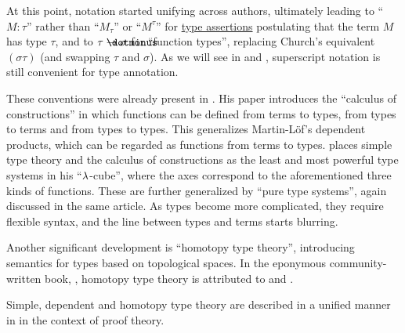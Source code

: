 \begin{remark}
  At this point, notation started unifying across authors, ultimately leading to \enquote{\( M: \tau \)} rather than \enquote{\( M_\tau \)} or \enquote{\( M^\tau \)} for \hyperref[def:type_assertion]{type assertions} postulating that the term \( M \) has type \( \tau \), and to \( \tau \synimplies \sigma \) for \enquote{function types}, replacing Church's equivalent \( (\sigma\tau) \) (and swapping \( \tau \) and \( \sigma \)). As we will see in  and , superscript notation is still convenient for type annotation.

  These conventions were already present in . His paper introduces the \enquote{calculus of constructions} in which functions can be defined from terms to types, from types to terms and from types to types. This generalizes Martin-L\"of's dependent products, which can be regarded as functions from terms to types.  places simple type theory and the calculus of constructions as the least and most powerful type systems in his \enquote{\( \mathrm{\lambda} \)-cube}, where the axes correspond to the aforementioned three kinds of functions. These are further generalized by \enquote{pure type systems}, again discussed in the same article. As types become more complicated, they require flexible syntax, and the line between types and terms starts blurring.

  Another significant development is \enquote{homotopy type theory}, introducing semantics for types based on topological spaces. In the eponymous community-written book, \cite{UnivalentProject2024OctoberHoTT}, homotopy type theory is attributed to \cite{Voevodski2006HoTT} and \cite{AwodeyWarren2009HoTT}.

  Simple, dependent and homotopy type theory are described in a unified manner in \cite{Mimram2020ProgramEqualsProof} in the context of proof theory.
\end{remark}

